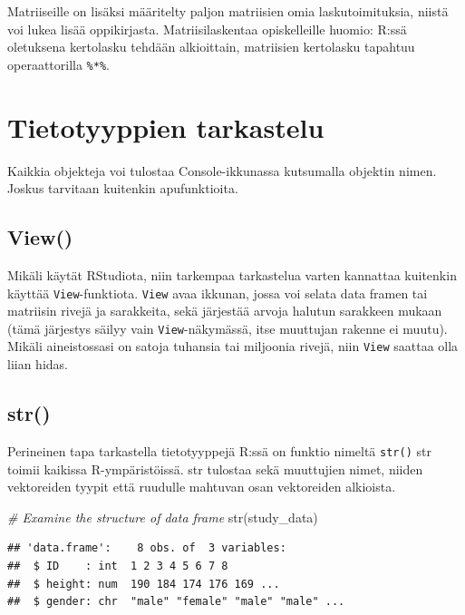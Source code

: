 \documentclass[
]{book}
\newenvironment{Shaded}{\begin{snugshade}}{\end{snugshade}}
\newcommand{\CommentTok}[1]{\textcolor[rgb]{0.56,0.35,0.01}{\textit{#1}}}
\newcommand{\FunctionTok}[1]{\textcolor[rgb]{0.00,0.00,0.00}{#1}}
\newcommand{\NormalTok}[1]{#1}
\begin{document}
Matriiseille on lisäksi määritelty paljon matriisien omia laskutoimituksia, niistä voi lukea lisää oppikirjasta. Matriisilaskentaa opiskelleille huomio: R:ssä oletuksena kertolasku tehdään alkioittain, matriisien kertolasku tapahtuu operaattorilla \texttt{\%*\%}.

\hypertarget{tietotyyppien-tarkastelu}{%
\section{Tietotyyppien tarkastelu}\label{tietotyyppien-tarkastelu}}

Kaikkia objekteja voi tulostaa Console-ikkunassa kutsumalla objektin nimen. Joskus tarvitaan kuitenkin apufunktioita.

\hypertarget{view}{%
\subsection{View()}\label{view}}

Mikäli käytät RStudiota, niin tarkempaa tarkastelua varten kannattaa kuitenkin käyttää \texttt{View}-funktiota. \texttt{View} avaa ikkunan, jossa voi selata data framen tai matriisin rivejä ja sarakkeita, sekä järjestää arvoja halutun sarakkeen mukaan (tämä järjestys säilyy vain \texttt{View}-näkymässä, itse muuttujan rakenne ei muutu). Mikäli aineistossasi on satoja tuhansia tai miljoonia rivejä, niin \texttt{View} saattaa olla liian hidas.

\hypertarget{str}{%
\subsection{str()}\label{str}}

Perineinen tapa tarkastella tietotyyppejä R:ssä on funktio nimeltä \texttt{str()} str toimii kaikissa R-ympäristöissä. str tulostaa sekä muuttujien nimet, niiden vektoreiden tyypit että ruudulle mahtuvan osan vektoreiden alkioista.

\begin{Shaded}
\begin{Highlighting}[]
\CommentTok{\# Examine the structure of data frame}
\FunctionTok{str}\NormalTok{(study\_data)}
\end{Highlighting}
\end{Shaded}

\begin{verbatim}
## 'data.frame':    8 obs. of  3 variables:
##  $ ID    : int  1 2 3 4 5 6 7 8
##  $ height: num  190 184 174 176 169 ...
##  $ gender: chr  "male" "female" "male" "male" ...
\end{verbatim}
\end{document}
